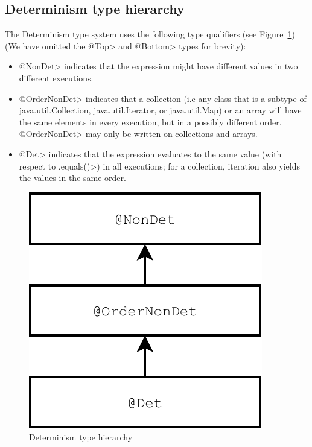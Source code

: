 \subsection{Determinism type hierarchy}
The Determinism type system uses the following type qualifiers (see Figure~\ref{fig-determinism-hierarchy}) (We have omitted the
\<@Top> and \<@Bottom> types for brevity):
\begin{itemize}
	\item \<@NonDet> indicates
	that the expression might have different values in two different executions.
	\item \<@OrderNonDet> indicates that
	a collection (i.e any class that is a subtype of java.util.Collection, java.util.Iterator, or java.util.Map) or an array will have the same elements in every execution, but in a
	possibly different order.  \<@OrderNonDet> may only be written on
	collections and arrays.
	\item \<@Det> indicates that
	the expression evaluates to the same value (with respect to \<.equals()>) in all
	executions; for a collection, iteration also yields the values in the same
	order.
\end{itemize}

\begin{figure}
	\begin{center}
		\includegraphics[scale=0.5]{determinism}
	\end{center}
	\caption{Determinism type hierarchy}
	\label{fig-determinism-hierarchy}
\end{figure}

